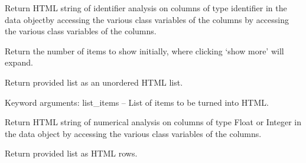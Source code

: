 \documentclass[letterpaper,10pt,english]{sphinxmanual}
\begin{document}
\begin{fulllineitems}
\begin{fulllineitems}
\label{Code_rst/rep:report.Report.identifier_analysis}
Return HTML string of identifier analysis on columns of type identifier
in the data objectby accessing the various class variables of the
columns by accessing the various class variables of the
columns.

\end{fulllineitems}


\begin{fulllineitems}
\label{Code_rst/rep:report.Report.initial_show_items}
Return the number of items to show initially, where clicking `show more' will expand.

\end{fulllineitems}


\begin{fulllineitems}
\label{Code_rst/rep:report.Report.list_creator}
Return provided list as an unordered HTML list.

Keyword arguments:
list\_items -- List of items to be turned into HTML.

\end{fulllineitems}


\begin{fulllineitems}
\label{Code_rst/rep:report.Report.numerical_analysis}
Return HTML string of numerical analysis on columns of type Float or 
Integer in the data object by accessing the various class variables of the
columns.

\end{fulllineitems}


\begin{fulllineitems}
\label{Code_rst/rep:report.Report.row_creator}
Return provided list as HTML rows.


\end{fulllineitems}
\end{fulllineitems}
\end{document}
